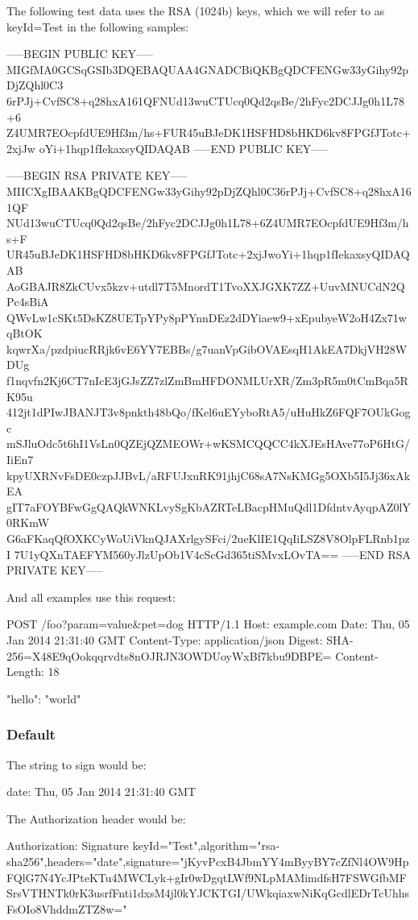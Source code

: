 The following test data uses the R\+SA (1024b) keys, which we will refer to as {\ttfamily key\+Id=Test} in the following samples\+: \begin{DoxyVerb}-----BEGIN PUBLIC KEY-----
MIGfMA0GCSqGSIb3DQEBAQUAA4GNADCBiQKBgQDCFENGw33yGihy92pDjZQhl0C3
6rPJj+CvfSC8+q28hxA161QFNUd13wuCTUcq0Qd2qsBe/2hFyc2DCJJg0h1L78+6
Z4UMR7EOcpfdUE9Hf3m/hs+FUR45uBJeDK1HSFHD8bHKD6kv8FPGfJTotc+2xjJw
oYi+1hqp1fIekaxsyQIDAQAB
-----END PUBLIC KEY-----

-----BEGIN RSA PRIVATE KEY-----
MIICXgIBAAKBgQDCFENGw33yGihy92pDjZQhl0C36rPJj+CvfSC8+q28hxA161QF
NUd13wuCTUcq0Qd2qsBe/2hFyc2DCJJg0h1L78+6Z4UMR7EOcpfdUE9Hf3m/hs+F
UR45uBJeDK1HSFHD8bHKD6kv8FPGfJTotc+2xjJwoYi+1hqp1fIekaxsyQIDAQAB
AoGBAJR8ZkCUvx5kzv+utdl7T5MnordT1TvoXXJGXK7ZZ+UuvMNUCdN2QPc4sBiA
QWvLw1cSKt5DsKZ8UETpYPy8pPYnnDEz2dDYiaew9+xEpubyeW2oH4Zx71wqBtOK
kqwrXa/pzdpiucRRjk6vE6YY7EBBs/g7uanVpGibOVAEsqH1AkEA7DkjVH28WDUg
f1nqvfn2Kj6CT7nIcE3jGJsZZ7zlZmBmHFDONMLUrXR/Zm3pR5m0tCmBqa5RK95u
412jt1dPIwJBANJT3v8pnkth48bQo/fKel6uEYyboRtA5/uHuHkZ6FQF7OUkGogc
mSJluOdc5t6hI1VsLn0QZEjQZMEOWr+wKSMCQQCC4kXJEsHAve77oP6HtG/IiEn7
kpyUXRNvFsDE0czpJJBvL/aRFUJxuRK91jhjC68sA7NsKMGg5OXb5I5Jj36xAkEA
gIT7aFOYBFwGgQAQkWNKLvySgKbAZRTeLBacpHMuQdl1DfdntvAyqpAZ0lY0RKmW
G6aFKaqQfOXKCyWoUiVknQJAXrlgySFci/2ueKlIE1QqIiLSZ8V8OlpFLRnb1pzI
7U1yQXnTAEFYM560yJlzUpOb1V4cScGd365tiSMvxLOvTA==
-----END RSA PRIVATE KEY-----
\end{DoxyVerb}


And all examples use this request\+:

\begin{DoxyVerb}POST /foo?param=value&pet=dog HTTP/1.1
Host: example.com
Date: Thu, 05 Jan 2014 21:31:40 GMT
Content-Type: application/json
Digest: SHA-256=X48E9qOokqqrvdts8nOJRJN3OWDUoyWxBf7kbu9DBPE=
Content-Length: 18

{"hello": "world"}
\end{DoxyVerb}


\subsubsection*{Default}

The string to sign would be\+:

\begin{DoxyVerb}date: Thu, 05 Jan 2014 21:31:40 GMT
\end{DoxyVerb}


The Authorization header would be\+:

\begin{DoxyVerb}Authorization: Signature keyId="Test",algorithm="rsa-sha256",headers="date",signature="jKyvPcxB4JbmYY4mByyBY7cZfNl4OW9HpFQlG7N4YcJPteKTu4MWCLyk+gIr0wDgqtLWf9NLpMAMimdfsH7FSWGfbMFSrsVTHNTk0rK3usrfFnti1dxsM4jl0kYJCKTGI/UWkqiaxwNiKqGcdlEDrTcUhhsFsOIo8VhddmZTZ8w="
\end{DoxyVerb}


